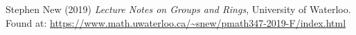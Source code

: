 \begin{thebibliography}{9}
Stephen New (2019) \emph{Lecture Notes on Groups and Rings}, University of Waterloo.
Found at:  \url{https://www.math.uwaterloo.ca/~snew/pmath347-2019-F/index.html}

\end{thebibliography}
